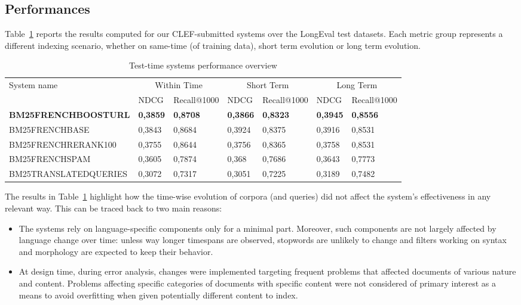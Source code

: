 \subsection{Performances}
\label{subsec:perfs}
Table~\ref{tab:sysperftest} reports the results computed for our CLEF-submitted systems over the LongEval test datasets. Each metric group represents a different indexing scenario, whether on same-time (of training data), short term evolution or long term evolution.
\begin{table}[tb]
  \caption{Test-time systems performance overview}
  \label{tab:sysperftest}
  \centering
  \begin{tabular}{|l|l|l|l|l|l|l|}
    \toprule
    \multirow{2}{*}{System name} & \multicolumn{2}{|c|}{Within Time} & \multicolumn{2}{|c|}{Short Term} & \multicolumn{2}{|c|}{Long Term}\\ 
    & NDCG & Recall@1000 & NDCG & Recall@1000 & NDCG & Recall@1000\\
    \midrule
    \textbf{BM25FRENCHBOOSTURL} & \textbf{0,3859} & \textbf{0,8708} & \textbf{0,3866} & \textbf{0,8323} & \textbf{0,3945} & \textbf{0,8556}\\
    BM25FRENCHBASE & 0,3843 & 0,8684 & 0,3924 & 0,8375 & 0,3916 & 0,8531\\
    BM25FRENCHRERANK100 & 0,3755 & 0,8644 & 0,3756 & 0,8365 & 0,3758 & 0,8531\\
    BM25FRENCHSPAM & 0,3605 & 0,7874 & 0,368 & 0,7686 & 0,3643 & 0,7773\\
    BM25TRANSLATEDQUERIES & 0,3072 & 0,7317 & 0,3051 & 0,7225 & 0,3189 & 0,7482\\
  \bottomrule
\end{tabular}
\end{table}
\par The results in Table~\ref{tab:sysperftest} highlight how the time-wise evolution of corpora (and queries) did not affect the system's effectiveness in any relevant way. This can be traced back to two main reasons:
\begin{itemize}
    \item The systems rely on language-specific components only for a minimal part. Moreover, such components are not largely affected by language change over time: unless way longer timespans are observed, stopwords are unlikely to change and filters working on syntax and morphology are expected to keep their behavior.
    \item At design time, during error analysis, changes were implemented targeting frequent problems that affected documents of various nature and content. Problems affecting specific categories of documents with specific content were not considered of primary interest as a means to avoid overfitting when given potentially different content to index.
\end{itemize}


